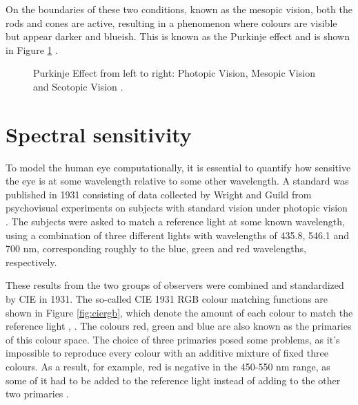 On the boundaries of these two conditions, known as the mesopic vision, both the rods and cones are active, resulting in a phenomenon where colours are visible but appear darker and blueish. This is known as the Purkinje effect and is shown in Figure \ref{fig:purkinje} \cite[5]{measuringcolour}.


\begin{figure}
    \centering
    \caption{Purkinje Effect from left to right: Photopic Vision, Mesopic Vision and Scotopic Vision \cite{purkinje_effect}.}
    \label{fig:purkinje}
\end{figure}

\section{Spectral sensitivity}
\label{sec:responsivity}

To model the human eye computationally, it is essential to quantify how sensitive the eye is at some wavelength relative to some other wavelength. A standard was published in 1931 consisting of data collected by Wright and Guild from psychovisual experiments on subjects with standard vision under photopic vision \cite{wrightetguild}. The subjects were asked to match a reference light at some known wavelength, using a combination of three different lights with wavelengths of 435.8, 546.1 and 700 nm, corresponding roughly to the blue, green and red wavelengths, respectively. 

These results from the two groups of observers were combined and standardized by CIE in 1931. The so-called CIE 1931 RGB colour matching functions are shown in Figure \ref{fig:ciergb}, which denote the amount of each colour to match the reference light \cite{observer}, \cite{fairman1997cie}. The colours red, green and blue are also known as the primaries of this colour space. The choice of three primaries posed some problems, as it's impossible to reproduce every colour with an additive mixture of fixed three colours. As a result, for example, red is negative in the 450-550 nm range, as some of it had to be added to the reference light instead of adding to the other two primaries \cite[65]{colorimetry}.

